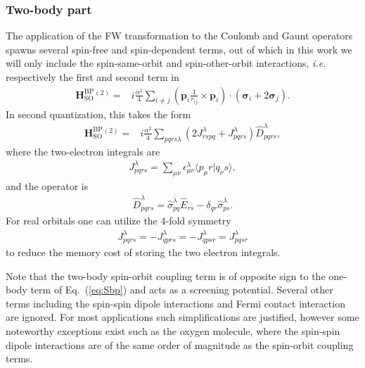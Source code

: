 \documentclass[10pt,aps,prb,twocolumn,amsmath,amssymb,superscriptaddress]{revtex4-1}
\renewcommand\b[1]{\ensuremath{\mathbf{#1}}}
\newcommand\B[1]  {\ensuremath{\pmb #1}}
\begin{document}
\subsubsection{Two-body part}
The application of the FW transformation to the Coulomb and Gaunt operators spawns several spin-free and spin-dependent terms, out of which in this work we will only include the spin-same-orbit and spin-other-orbit interactions, \textit{i.e.} respectively the first and second term in
\begin{align}
    \b{H}^\text{BP}_\text{SO}{}^{(2)}
    =& i \frac{\alpha^2}{4}\sum_{i\neq j} \left(\b{p}_i\frac{1}{r_{ij}}  \times\b{p}_i\right) \cdot (\B{\sigma}_i+2\B{\sigma}_j).
\end{align}
In second quantization, this takes the form
\begin{align}
    \b{H}^\text{BP}_\text{SO}{}^{(2)}
    =&i \frac{\alpha^2}{4}\sum_{pqrs\lambda}\left( 2J_{rspq}^\lambda +  J_{pqrs}^\lambda\right) \hat{D}^\lambda_{pqrs}
,\end{align}
where the two-electron integrals are
\begin{align}
    J_{pqrs}^\lambda=\sum_{\mu\nu} \epsilon_{\mu\nu}^\lambda \langle p_\mu r| q_\nu s\rangle
    \label{eq:Jbp}
,\end{align}
and the operator is 
\begin{align}
\hat{D}^\lambda_{pqrs}=\hat{\sigma}_{pq}^\lambda \hat{E}_{rs}-\delta_{qr} \hat{\sigma}_{ps}^\lambda
.\end{align}
For real orbitals one can utilize the 4-fold symmetry 
\begin{align}
J_{pqrs}^\lambda = -J_{qprs}^\lambda=-J_{qpsr}^\lambda=J_{pqsr}^\lambda
\end{align}
to reduce the memory cost of storing the two electron integrals.

Note that the two-body spin-orbit coupling term is of opposite sign to the one-body term of Eq.~(\ref{eq:Sbp}) and acts as a screening potential.
Several other terms including the spin-spin dipole interactions and Fermi contact interaction are ignored. For most applications such simplifications are justified, however some noteworthy exceptions exist such as the oxygen molecule\cite{Langhoff1974,Vahtras2002}, where the spin-spin dipole interactions are of the same order of magnitude as the spin-orbit coupling terms.
\end{document}
